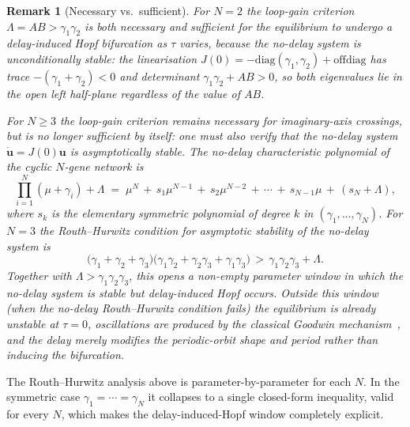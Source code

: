 \documentclass[sn-mathphys,Numbered]{sn-jnl}
\theoremstyle{thmstyleone}
\theoremstyle{thmstyletwo}
\theoremstyle{thmstylethree}
\newtheorem{remark}{Remark}
\begin{document}
\begin{remark}[Necessary vs.\ sufficient]
\label{rem:necessary_sufficient}
For $N=2$ the loop-gain criterion $\Lambda=AB>\gamma_1\gamma_2$ is both
necessary and sufficient for the equilibrium to undergo a delay-induced
Hopf bifurcation as $\tau$ varies, because the no-delay system is
unconditionally stable: the linearisation
$J(0)=-\mathrm{diag}(\gamma_1,\gamma_2)+\mathrm{offdiag}$ has trace
$-(\gamma_1+\gamma_2)<0$ and determinant $\gamma_1\gamma_2+AB>0$, so
both eigenvalues lie in the open left half-plane regardless of the
value of $AB$.

For $N\geq 3$ the loop-gain criterion remains \emph{necessary} for
imaginary-axis crossings, but is no longer sufficient by itself: one
must also verify that the no-delay system $\dot{\mathbf{u}}=J(0)\mathbf{u}$
is asymptotically stable. The no-delay characteristic polynomial of the
cyclic $N$-gene network is
\[
\prod_{i=1}^N (\mu+\gamma_i) + \Lambda \;=\;
   \mu^N \,+\, s_1\mu^{N-1} \,+\, s_2\mu^{N-2} \,+\, \cdots
   \,+\, s_{N-1}\mu \,+\, (s_N+\Lambda),
\]
where $s_k$ is the elementary symmetric polynomial of degree $k$ in
$(\gamma_1,\ldots,\gamma_N)$. For $N=3$ the Routh--Hurwitz condition
for asymptotic stability of the no-delay system is
\[
\bigl(\gamma_1+\gamma_2+\gamma_3\bigr)\bigl(\gamma_1\gamma_2
+\gamma_2\gamma_3+\gamma_1\gamma_3\bigr)
\,>\, \gamma_1\gamma_2\gamma_3+\Lambda.
\]
Together with $\Lambda>\gamma_1\gamma_2\gamma_3$, this opens a
non-empty parameter window in which the no-delay system is stable but
delay-induced Hopf occurs. Outside this window
(when the no-delay Routh--Hurwitz condition fails) the equilibrium is
already unstable at $\tau=0$, oscillations are produced by the
classical Goodwin
mechanism~\cite{hastings1977existence,smith2011introduction}, and the
delay merely modifies the periodic-orbit shape and period rather than
inducing the bifurcation.
\end{remark}

The Routh--Hurwitz analysis above is parameter-by-parameter for each
$N$. In the symmetric case $\gamma_1=\cdots=\gamma_N$ it collapses to a
single closed-form inequality, valid for every $N$, which makes the
delay-induced-Hopf window completely explicit.
\end{document}
